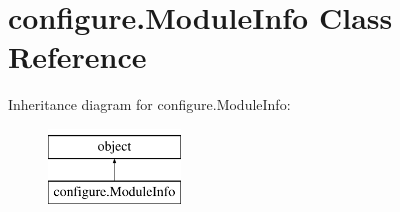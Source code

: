 \hypertarget{classconfigure_1_1ModuleInfo}{\section{configure.\-Module\-Info Class Reference}
\label{classconfigure_1_1ModuleInfo}
}
Inheritance diagram for configure.\-Module\-Info\-:\begin{figure}[H]
\begin{center}
\leavevmode
\includegraphics[height=2.000000cm]{classconfigure_1_1ModuleInfo}
\end{center}
\end{figure}
